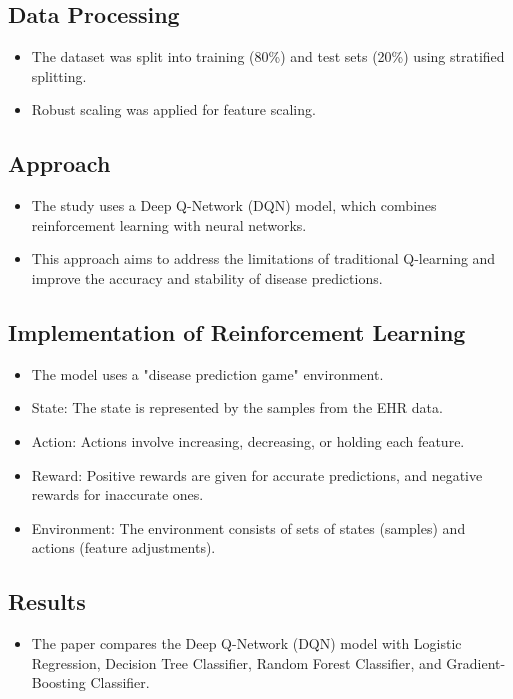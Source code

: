 \subsection*{Data Processing}
\begin{itemize}
    \item The dataset was split into training (80\%) and test sets (20\%) using stratified splitting.
    \item Robust scaling was applied for feature scaling.
\end{itemize}

\subsection*{Approach}
\begin{itemize}
    \item The study uses a Deep Q-Network (DQN) model, which combines reinforcement learning with neural networks.
    \item This approach aims to address the limitations of traditional Q-learning and improve the accuracy and stability of disease predictions.
\end{itemize}

\subsection*{Implementation of Reinforcement Learning}
\begin{itemize}
    \item The model uses a "disease prediction game" environment.
    \item State: The state is represented by the samples from the EHR data.
    \item Action: Actions involve increasing, decreasing, or holding each feature.
    \item Reward: Positive rewards are given for accurate predictions, and negative rewards for inaccurate ones.
    \item Environment: The environment consists of sets of states (samples) and actions (feature adjustments).
\end{itemize}

\subsection*{Results}
\begin{itemize}
    \item The paper compares the Deep Q-Network (DQN) model with Logistic Regression, Decision Tree Classifier, Random Forest Classifier, and Gradient-Boosting Classifier.
\end{itemize}

